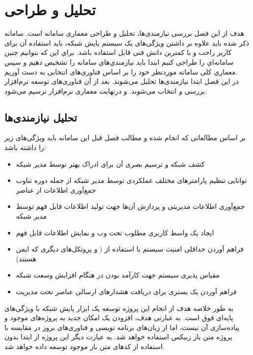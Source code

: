 \chapter{تحلیل و طراحی}

هدف از این فصل بررسی نیازمندی‌ها، تحلیل و طراحی معماری سامانه است. سامانه ذکر شده باید علاوه بر داشتن ویژگی‌های یک سیستم پایش شبکه، باید استفاده آن برای کاربر راحت و با کمترین دانش فنی قابل استفاده باشد. براي این که بتوانیم چنین سامانه‌اي را طراحی کنیم ابتدا باید نیازمندي‌هاي سامانه را تشخیص دهیم و سپس معماري کلی سامانه موردنظر خود را بر اساس فناوری‌های انتخابی به دست آوریم.
\\
در این فصل ابتدا نیازمندی‌ها تحلیل می‌شوند. بعد از آن فناوری‌های توسعه نرم‌افزار بررسی و انتخاب می‌شوند. و درنهایت معماری نرم‌افزار ترسیم می‌شود.



\section{تحلیل نیازمندی‌ها}

 بر اساس مطالعاتی که انجام شده و مطالب فصل قبل این سامانه باید ویژگی‌های زیر را داشته باشد:

\begin{itemize}
    \item کشف شبکه و ترسیم بصری آن برای ادراک بهتر توسط مدیر شبکه
    \item توانایی تنظیم پارامترهای مختلف عملکردی توسط مدیر شبکه از جمله دوره تناوب جمع‌آوری اطلاعات از عناصر
    \item جمع‌آوری اطلاعات مدیریتی و پردازش آن‌ها جهت تولید اطلاعات قابل فهم توسط مدیر شبکه
    \item ایجاد یک واسط کاربری مطلوب تحت وب و نمایش اطلاعات قابل فهم 
    \item فراهم آوردن حداقلی امنیت سیستم با استفاده از ( و پروتکل‌های دیگری که ایمن هستند)
    \item مقیاس پذیری سیستم جهت کارآمد بودن در هنگام افزایش وسعت شبکه
    \item فراهم آوردن یک بستری برای دریافت هشدارهای ارسالی عناصر تحت مدیریت
\end{itemize}

\newpage

به طور خلاصه هدف از انجام این پروژه توسعه یک ابزار پایش شبکه با ویژگی‌های پایه‌ای فوق است. به عبارتی هدف، افزودن یک امکان جدید به پروژه‌های موجود و پیاده‌سازی آن نیست، اما از زبان‌های برنامه نویسی و فناوری‌های بروز در مقایسه با پروژه متن باز زبیکس استفاده خواهد شد. به عبارت دیگر این پروژه از ابتدا بدون استفاده از کدهای متن باز موجود توسعه داده خواهد شد.



